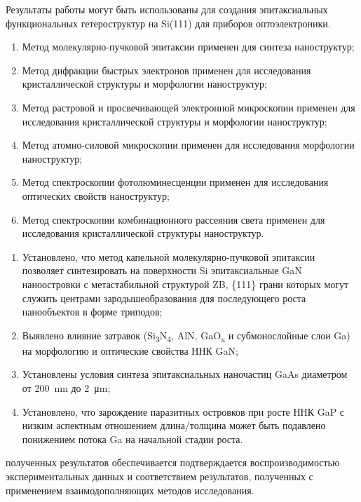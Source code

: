 {\influence} Результаты работы могут быть использованы для создания эпитаксиальных функциональных гетероструктур на Si(111) для приборов оптоэлектроники.

{\methods}
\begin{enumerate}[beginpenalty=10000]
  \item Метод молекулярно-пучковой эпитаксии применен для синтеза наноструктур;
  \item Метод дифракции быстрых электронов применен для исследования кристаллической структуры и морфологии наноструктур;
  \item Метод растровой и просвечивающей электронной микроскопии применен для исследования кристаллической структуры и морфологии наноструктур;
  \item Метод атомно-силовой микроскопии применен для исследования морфологии наноструктур;
  \item Метод спектроскопии фотолюминесценции применен для исследования оптических свойств наноструктур;
  \item Метод спектроскопии комбинационного рассеяния света применен для исследования кристаллической структуры наноструктур.
\end{enumerate}

{}
\begin{enumerate}[beginpenalty=10000] %
  \item	Установлено, что метод капельной молекулярно-пучковой эпитаксии позволяет синтезировать на поверхности Si эпитаксиальные GaN наноостровки с метастабильной структурой ZB, \{111\} грани которых могут служить центрами зародышеобразования для последующего роста нанообъектов в форме триподов;
  \item Выявлено влияние затравок (Si\textsubscript{3}N\textsubscript{4}, AlN, GaO\textsubscript{x} и субмонослойные слои Ga) на морфологию и оптические свойства ННК GaN;
  \item Установлены условия синтеза эпитаксиальных наночастиц GaAs диаметром от 200~\si{\nano\metre} до 2~\si{\micro\metre};
  \item Установлено, что зарождение паразитных островков при росте ННК GaP с низким аспектным отношением длина/толщина может быть подавлено понижением потока Ga на начальной стадии роста.
\end{enumerate}

{\reliability} полученных результатов обеспечивается подтверждается воспроизводимостью экспериментальных данных и соответствием результатов, полученных с применением взаимодополняющих методов исследования.


